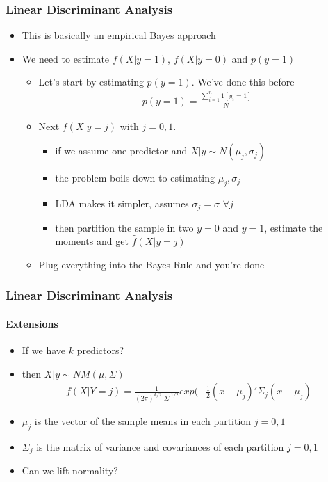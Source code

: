 \documentclass[
  shownotes,
  xcolor={svgnames},
  hyperref={colorlinks,citecolor=DarkBlue,linkcolor=DarkRed,urlcolor=DarkBlue}
  , aspectratio=169]{beamer}
\begin{document}
\begin{frame}[fragile]
\frametitle{Linear Discriminant Analysis}
\begin{itemize}
  \item This is basically an empirical Bayes approach
  \item We need to estimate $f(X|y=1)$,  $f(X|y=0)$ and $p(y=1)$ 
  \begin{itemize}
    \item Let's start by estimating $p(y=1)$. We've done this before
    \begin{align}
    p(y=1) = \frac{\sum_{i=1}^n 1[y_i=1]}{N}
    \end{align}
    \item Next $f(X|y=j)$ with $j=0,1$. 
    \begin{itemize}
    \item if we assume one predictor and $X|y\sim N(\mu_j,\sigma_j)$
    \item the problem boils down to estimating $\mu_j,\sigma_j$
    \item LDA makes it simpler, assumes $\sigma_j=\sigma$ $\forall j$
    \item then partition the sample in two $y=0$ and $y=1$, estimate the moments and get $\hat{f}(X|y=j)$
    \end{itemize}
    \item Plug everything into the Bayes Rule and you're done
    

  \end{itemize}
\end{itemize}


\end{frame}
\begin{frame}[fragile]
\frametitle{Linear Discriminant Analysis}
\framesubtitle{Extensions}

\begin{itemize}
    \item If we have $k$ predictors?
    \medskip
    \item then $X|y\sim NM(\mu,\Sigma)$
    \begin{align}
    f(X|Y=j) = \frac{1}{(2\pi)^{k/2}|\Sigma|^{1/2}}exp(-\frac{1}{2}(x-\mu_j)'\Sigma_j(x-\mu_j)
    \end{align}
    \item $\mu_j$ is the vector of the sample means in each partition $j=0,1$
    \medskip
    \item $\Sigma_j$ is the matrix of variance and covariances of each partition $j=0,1$
    \medskip
    \item Can we lift normality? 
    \end{itemize}
\end{frame}
\end{document}
